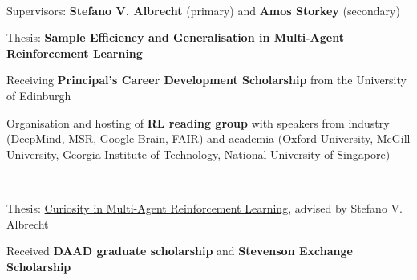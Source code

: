 \documentclass[]{lukas-cv-openfont}
\begin{document}

\noindent
{}
\\
\begin{tightitemize}{1.7em}
    \item Supervisors: \textbf{Stefano V. Albrecht} (primary) and \textbf{Amos Storkey} (secondary)
    \item Thesis: \textbf{Sample Efficiency and Generalisation in Multi-Agent Reinforcement Learning}
    \item Receiving \textbf{Principal's Career Development Scholarship} from the University of Edinburgh
    \item Organisation and hosting of \textbf{RL reading group} with speakers from industry (DeepMind, MSR, Google Brain, FAIR) and academia (Oxford University, McGill University, Georgia Institute of Technology, National University of Singapore)

\end{tightitemize}
\sectionsep

\noindent
{}
\\
\begin{tightitemize}{1.7em}
    \item Thesis: \href{https://www.lukaschaefer.com/assets/files/msc_thesis.pdf}{Curiosity in Multi-Agent Reinforcement Learning}, advised by Stefano V. Albrecht
    \item Received \textbf{DAAD graduate scholarship} and \textbf{Stevenson Exchange Scholarship} 
\end{tightitemize}
\sectionsep
\end{document}
